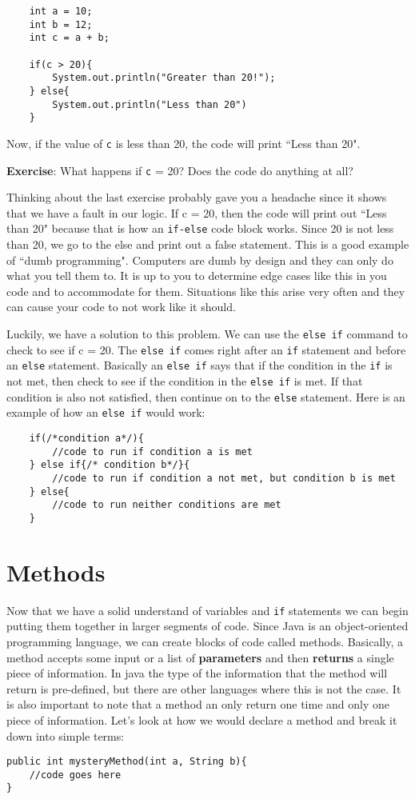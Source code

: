 \documentclass[11pt,fleqn]{article}
\begin{document}
\begin{verbatim}
    int a = 10;
    int b = 12;
    int c = a + b;

    if(c > 20){
        System.out.println("Greater than 20!");
    } else{
        System.out.println("Less than 20")
    }
\end{verbatim}

Now, if the value of \texttt{c} is less than 20, the code will print ``Less than
20". 

\textbf{Exercise}: What happens if \texttt{c} = 20? Does the code do anything at
all?

Thinking about the last exercise probably gave you a headache since it shows
that we have a fault in our logic. If c = 20, then the code will print out
``Less than 20" because that is how an \texttt{if-else} code block works. Since
20 is not less than 20, we go to the else and print out a false statement. This
is a good example of ``dumb programming". Computers are dumb by design and they
can only do what you tell them to. It is up to you to determine edge cases like
this in you code and to accommodate for them. Situations like this arise very
often and they can cause your code to not work like it should. 

Luckily, we have a solution to this problem. We can use the \texttt{else if}
command to check to see if c = 20. The \texttt{else if} comes right after an
\texttt{if} statement and before an \texttt{else} statement. Basically an
\texttt{else if} says that if the condition in the \texttt{if} is not met, then
check to see if the condition in the \texttt{else if} is met. If that condition
is also not satisfied, then continue on to the \texttt{else} statement. Here is
an example of how an \texttt{else if} would work:

\begin{verbatim}
    if(/*condition a*/){
        //code to run if condition a is met
    } else if{/* condition b*/}{
        //code to run if condition a not met, but condition b is met
    } else{
        //code to run neither conditions are met
    }
\end{verbatim}



\section*{Methods}

Now that we have a solid understand of variables and \texttt{if} statements we can
begin putting them together in larger segments of code. Since Java is an
object-oriented programming language, we can create blocks of code called
methods. Basically, a method accepts some input or a list of \textbf{parameters}
and then \textbf{returns} a single piece of information. In java the type of the
information that the method will return is pre-defined, but there are other
languages where this is not the case. It is also important to note that a method
an only return one time and only one piece of information. Let's look at how we
would declare a method and break it down into simple terms:

\begin{verbatim}
public int mysteryMethod(int a, String b){
    //code goes here
}
\end{verbatim}
\end{document}
